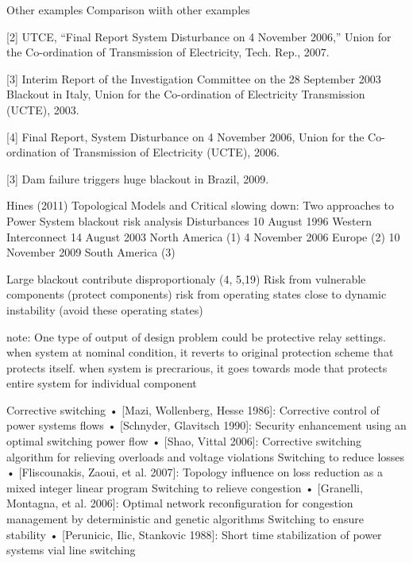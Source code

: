 
Other examples
Comparison wiith other examples

[2] UTCE, “Final Report System Disturbance on 4 November
2006,” Union for the Co-ordination of Transmission of Electricity,
Tech. Rep., 2007.

[3] Interim Report of the Investigation Committee on the 28 September
2003 Blackout in Italy, Union for the Co-ordination of Electricity
Transmission (UCTE), 2003.

[4] Final Report, System Disturbance on 4 November 2006, Union for the
Co-ordination of Transmission of Electricity (UCTE), 2006.

[3] Dam failure triggers huge blackout in Brazil, 2009.


Hines (2011) Topological Models and Critical slowing down: Two approaches to Power System blackout risk analysis
Disturbances
10 August 1996 Western Interconnect
14 August 2003 North America (1)
4 November 2006 Europe (2)
10 November 2009 South America (3)

Large blackout contribute disproportionaly (4, 5,19)
Risk from vulnerable components (protect components)
risk from operating states close to dynamic instability (avoid these operating states)



note: One type of output of design problem could be protective relay settings.  when system at nominal condition, it reverts to original protection scheme that protects itself.  when system is precrarious, it goes towards mode that protects entire system for individual component

Corrective switching
 • [Mazi, Wollenberg, Hesse 1986]: Corrective control of power systems flows
 • [Schnyder, Glavitsch 1990]: Security enhancement using an optimal switching power flow  
• [Shao, Vittal 2006]: Corrective switching algorithm for relieving overloads and voltage violations 
Switching to reduce losses 
• [Fliscounakis, Zaoui, et al. 2007]: Topology influence on loss reduction as a mixed integer linear program 
Switching to relieve congestion
• [Granelli, Montagna, et al. 2006]: Optimal network reconfiguration for congestion management by deterministic and genetic algorithms 
Switching to ensure stability 
 • [Perunicic, Ilic, Stankovic 1988]: Short time stabilization of power systems vial line switching 



